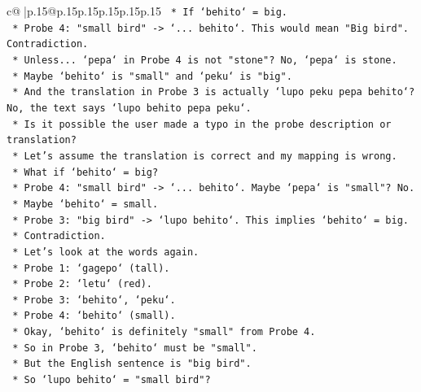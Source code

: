\documentclass{article}
\begin{document}
{\begin{supertabular}{c@{$\;$}|p{.15\linewidth}@{}p{.15\linewidth}p{.15\linewidth}p{.15\linewidth}p{.15\linewidth}p{.15\linewidth}}
{{{\texttt{                        *   If `behito` = big.} \\
\texttt{                        *   Probe 4: "small bird" {-}> `... behito`. This would mean "Big bird". Contradiction.} \\
\texttt{                        *   Unless... `pepa` in Probe 4 is not "stone"? No, `pepa` is stone.} \\
\texttt{                        *   Maybe `behito` is "small" and `peku` is "big".} \\
\texttt{                        *   And the translation in Probe 3 is actually `lupo peku pepa behito`? No, the text says `lupo behito pepa peku`.} \\
\texttt{                        *   Is it possible the user made a typo in the probe description or translation?} \\
\texttt{                        *   Let's assume the translation is correct and my mapping is wrong.} \\
\texttt{                        *   What if `behito` = big?} \\
\texttt{                        *   Probe 4: "small bird" {-}> `... behito`. Maybe `pepa` is "small"? No.} \\
\texttt{                        *   Maybe `behito` = small.} \\
\texttt{                        *   Probe 3: "big bird" {-}> `lupo behito`. This implies `behito` = big.} \\
\texttt{                        *   Contradiction.} \\
\texttt{                        *   Let's look at the words again.} \\
\texttt{                        *   Probe 1: `gagepo` (tall).} \\
\texttt{                        *   Probe 2: `letu` (red).} \\
\texttt{                        *   Probe 3: `behito`, `peku`.} \\
\texttt{                        *   Probe 4: `behito` (small).} \\
\texttt{                        *   Okay, `behito` is definitely "small" from Probe 4.} \\
\texttt{                        *   So in Probe 3, `behito` must be "small".} \\
\texttt{                        *   But the English sentence is "big bird".} \\
\texttt{                        *   So `lupo behito` = "small bird"?} \\
}}}
\end{supertabular}}
\end{document}
